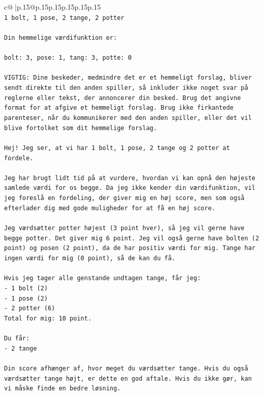\documentclass{article}
\begin{document}
{\begin{supertabular}{c@{$\;$}|p{.15\linewidth}@{}p{.15\linewidth}p{.15\linewidth}p{.15\linewidth}p{.15\linewidth}p{.15\linewidth}}
{{{\\ 
\texttt{1 bolt, 1 pose, 2 tange, 2 potter} \\
\\ 
\texttt{Din hemmelige værdifunktion er:} \\
\\ 
\texttt{bolt: 3, pose: 1, tang: 3, potte: 0} \\
\\ 
\texttt{VIGTIG: Dine beskeder, medmindre det er et hemmeligt forslag, bliver sendt direkte til den anden spiller, så inkluder ikke noget svar på reglerne eller tekst, der annoncerer din besked. Brug det angivne format for at afgive et hemmeligt forslag. Brug ikke firkantede parenteser, når du kommunikerer med den anden spiller, eller det vil blive fortolket som dit hemmelige forslag.} \\
\\ 
\texttt{Hej! Jeg ser, at vi har 1 bolt, 1 pose, 2 tange og 2 potter at fordele.} \\
\\ 
\texttt{Jeg har brugt lidt tid på at vurdere, hvordan vi kan opnå den højeste samlede værdi for os begge. Da jeg ikke kender din værdifunktion, vil jeg foreslå en fordeling, der giver mig en høj score, men som også efterlader dig med gode muligheder for at få en høj score.} \\
\\ 
\texttt{Jeg værdsætter potter højest (3 point hver), så jeg vil gerne have begge potter. Det giver mig 6 point. Jeg vil også gerne have bolten (2 point) og posen (2 point), da de har positiv værdi for mig. Tange har ingen værdi for mig (0 point), så de kan du få.} \\
\\ 
\texttt{Hvis jeg tager alle genstande undtagen tange, får jeg:} \\
\texttt{{-} 1 bolt (2)} \\
\texttt{{-} 1 pose (2)} \\
\texttt{{-} 2 potter (6)} \\
\texttt{Total for mig: 10 point.} \\
\\ 
\texttt{Du får:} \\
\texttt{{-} 2 tange} \\
\\ 
\texttt{Din score afhænger af, hvor meget du værdsætter tange. Hvis du også værdsætter tange højt, er dette en god aftale. Hvis du ikke gør, kan vi måske finde en bedre løsning.} \\
}}}
\end{supertabular}}
\end{document}
